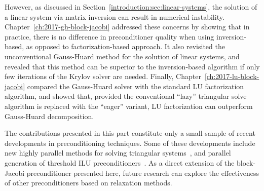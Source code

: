 However, as discussed in Section~\ref{introduction:sec:linear-systems}, the
solution of a linear system via matrix inversion can result in numerical
instability. Chapter~\ref{ch:2017-gh-block-jacobi} addressed these concerns by
showing that in practice, there is no difference in preconditioner quality
when using inversion-based, as opposed to factorization-based approach. It also
revisited the unconventional Gauss-Huard method for the solution of linear
systems, and revealed that this method can be superior to the inversion-based
algorithm if only few iterations of the Krylov solver are needed. Finally,
Chapter~\ref{ch:2017-lu-block-jacobi} compared the Gauss-Huard solver
with the standard LU factorization algorithm, and showed that, provided the
conventional ``lazy'' triangular solve algorithm is replaced with the ``eager''
variant, LU factorization can outperform Gauss-Huard decomposition.

The contributions presented in this part constitute only a small sample of
recent developments in preconditioning techniques. Some of these developments
include new highly parallel methods for solving triangular
systems~\cite{triangular-solve, isai, triangular-iterative}, and parallel
generation of threshold ILU preconditioners~\cite{ilut, ilut-gpu}. As a direct
extension of the block-Jacobi preconditioner presented here, future research can
explore the effectiveness of other preconditioners based on relaxation methods.

